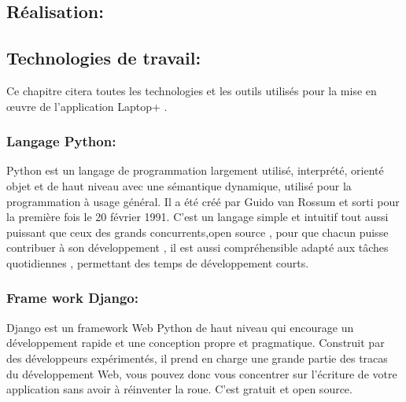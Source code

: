 \documentclass[a4paper,12pt]{report}
\begin{document}
\begin{doublespace}
\begin{doublespace}
\begin{doublespace}
\begin{doublespace}
\begin{doublespace}
\chapter{Réalisation:}
\fancyhead[L]{\hspace*{5cm}}
\begin{doublespace}

\section{Technologies de travail:}
Ce chapitre citera toutes les technologies et les outils utilisés pour la mise en œuvre de l'application Laptop+ .
\subsection{Langage Python:}
\begin{figure}[H]
\end{figure}
Python est un langage de programmation largement utilisé, interprété, orienté objet et de haut niveau avec une sémantique dynamique, utilisé pour la programmation à usage général. Il a été créé par Guido van Rossum et sorti pour la première fois le 20 février 1991. C'est un langage simple et intuitif tout aussi puissant que ceux des grands concurrents,open source , pour que chacun puisse contribuer à son développement , il est aussi compréhensible 
adapté aux tâches quotidiennes , permettant des temps de développement courts.

\newpage

\subsection{Frame work Django:}
\begin{figure}[H]
\end{figure}
 Django est un framework Web Python de haut niveau qui encourage un développement rapide et une conception propre et pragmatique. Construit par des développeurs expérimentés, il prend en charge une grande partie des tracas du développement Web, vous pouvez donc vous concentrer sur l'écriture de votre application sans avoir à réinventer la roue. C'est gratuit et open source.


\end{doublespace}
\end{doublespace}
\end{doublespace}
\end{doublespace}
\end{doublespace}
\end{doublespace}
\end{document}
